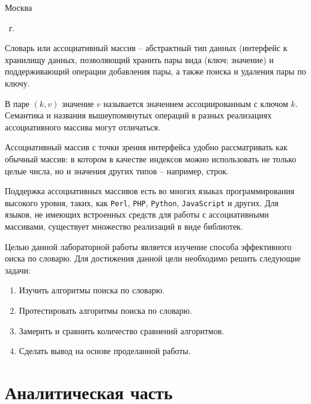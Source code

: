 \begin{center}
    \mbox{}
    \vfill
    Москва
\end{center}

\begin{center}
    \the\year ~г.
\end{center}
\clearpage

\renewcommand\contentsname{\hfill{\normalfont{СОДЕРЖАНИЕ}}\hfill}  %
\tableofcontents
\newpage


Словарь или ассоциативный массив -- абстрактный тип данных (интерфейс к хранилищу данных, позволяющий хранить пары вида (ключ; значение) и поддерживающий операции добавления пары, а также поиска и удаления пары по ключу.

В паре $(k,v)$ значение $v$ называется значением ассоциированным с ключом $k$. Семантика и названия вышеупомянутых операций в разных реализациях ассоциативного массива могут отличаться.

Ассоциативный массив с точки зрения интерфейса удобно рассматривать как обычный массив: в котором в качестве индексов можно использовать не только целые числа, но и значения других типов -- например, строк.

Поддержка ассоциативных массивов есть во многих языках программирования высокого уровня, таких, как \texttt{Perl}, \texttt{PHP}, \texttt{Python}, \texttt{JavaScript} и других. Для языков, не имеющих встроенных средств для работы с ассоциативными массивами, существует множество реализаций в виде библиотек.

Целью данной лабораторной работы является изучение способа эффективного оиска по словарю. Для достижения данной цели необходимо решить следующие задачи:

\begin{enumerate}
    \item Изучить алгоритмы поиска по словарю.
    \item Протестировать алгоритмы поиска по словарю.
    \item Замерить и сравнить количество сравнений алгоритмов.
    \item Сделать вывод на основе проделанной работы.
\end{enumerate}

\section{Аналитическая часть}

